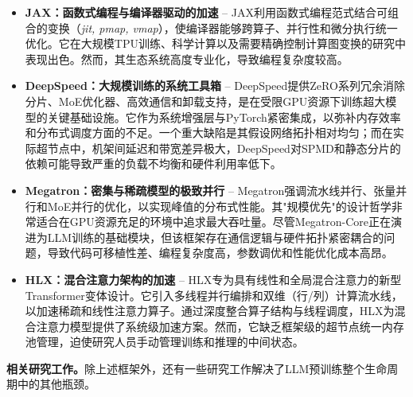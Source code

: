 \documentclass[11pt]{article}
\begin{document}
\begin{itemize}
    \item \textbf{JAX：函数式编程与编译器驱动的加速} -- JAX利用函数式编程范式结合可组合的变换（\textit{jit, pmap, vmap}），使编译器能够跨算子、并行性和微分执行统一优化。它在大规模TPU训练、科学计算以及需要精确控制计算图变换的研究中表现出色。然而，其生态系统高度专业化，导致编程复杂度较高。
    
    \item \textbf{DeepSpeed：大规模训练的系统工具箱} -- DeepSpeed提供ZeRO系列冗余消除分片、MoE优化器、高效通信和卸载支持，是在受限GPU资源下训练超大模型的关键基础设施。它作为系统增强层与PyTorch紧密集成，以弥补内存效率和分布式调度方面的不足。一个重大缺陷是其假设网络拓扑相对均匀；而在实际超节点中，机架间延迟和带宽差异极大，DeepSpeed对SPMD和静态分片的依赖可能导致严重的负载不均衡和硬件利用率低下。
    
    \item \textbf{Megatron：密集与稀疏模型的极致并行} -- Megatron强调流水线并行、张量并行和MoE并行的优化，以实现峰值的分布式性能。其"规模优先"的设计哲学非常适合在GPU资源充足的环境中追求最大吞吐量。尽管Megatron-Core正在演进为LLM训练的基础模块，但该框架存在通信逻辑与硬件拓扑紧密耦合的问题，导致代码可移植性差、编程复杂度高，参数调优和性能优化成本高昂。

    \item \textbf{HLX：混合注意力架构的加速} -- HLX专为具有线性和全局混合注意力的新型Transformer变体设计。它引入多线程并行编排和双维（行/列）计算流水线，以加速稀疏和线性注意力算子。通过深度整合算子结构与线程调度，HLX为混合注意力模型提供了系统级加速方案。然而，它缺乏框架级的超节点统一内存池管理，迫使研究人员手动管理训练和推理的中间状态。
\end{itemize}

\noindent \textbf{相关研究工作。}除上述框架外，还有一些研究工作解决了LLM预训练整个生命周期中的其他瓶颈。
\end{document}
